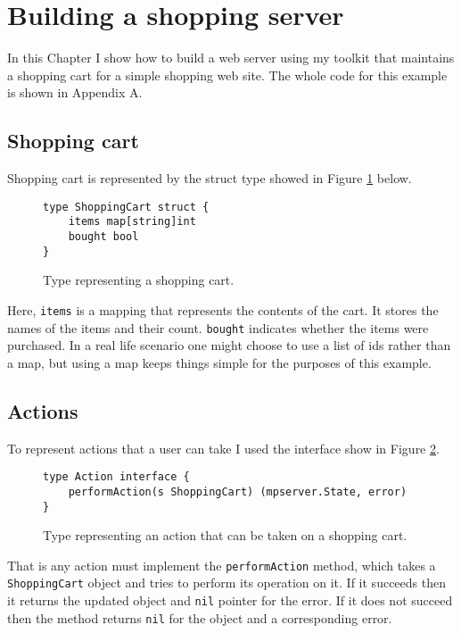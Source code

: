 \section{Building a shopping server}
\label{sec:shopping}
In this Chapter I show how to build a web server using my toolkit that
maintains a shopping cart for a simple shopping web site. The whole 
code for this example is shown in Appendix A.

\subsection{Shopping cart}
Shopping cart is represented by the struct type showed in Figure 
\ref{fig:shoppingCart} below.
\begin{figure}[h]
\begin{lstlisting}
type ShoppingCart struct {
    items map[string]int
    bought bool
}
\end{lstlisting}
\caption[scale=1.0]{Type representing a shopping cart.}
\label{fig:shoppingCart}
\end{figure}

Here, \texttt{items} is 
a mapping that represents the contents of the cart. It stores the names
of the items and their count. \texttt{bought} indicates whether the items
were purchased. In a real life scenario one might choose to use 
a list of ids rather than a map, but using a map keeps things simple
for the purposes of this example.

\subsection{Actions}
To represent actions that a user can take I used the interface show in 
Figure \ref{fig:action}.
\begin{figure}[h]
\begin{lstlisting}
type Action interface {
    performAction(s ShoppingCart) (mpserver.State, error)
}
\end{lstlisting}
\caption[scale=1.0]{Type representing an action that can be taken on 
a shopping cart.}
\label{fig:action}
\end{figure}
That is any action must implement the \texttt{performAction} method, which takes
a \texttt{ShoppingCart} object and tries to perform its operation on it. If
it succeeds then it returns the updated object and \texttt{nil} pointer for the
error. If it does not succeed then the method returns \texttt{nil} for the
object and a corresponding error.

